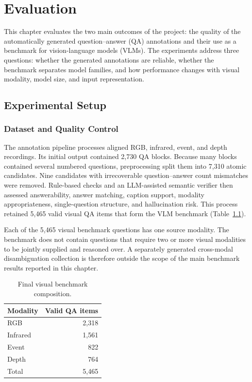
\chapter{Evaluation}
\label{ch:evaluation}

This chapter evaluates the two main outcomes of the project: the quality of
the automatically generated question--answer (QA) annotations and their use as
a benchmark for vision-language models (VLMs). The experiments address three
questions: whether the generated annotations are reliable, whether the
benchmark separates model families, and how performance changes with visual
modality, model size, and input representation.


\section{Experimental Setup}
\label{sec:evaluation_setup}

\subsection{Dataset and Quality Control}

The annotation pipeline processes aligned RGB, infrared, event, and
depth recordings. Its initial output contained 2,730 QA blocks. Because many
blocks contained several numbered questions, preprocessing split them into
7,310 atomic candidates. Nine candidates with irrecoverable question--answer
count mismatches were removed. Rule-based checks and an LLM-assisted semantic
verifier then assessed answerability, answer matching, caption support,
modality appropriateness, single-question structure, and hallucination
risk. This process retained 5,465 valid visual QA items that form the VLM benchmark
(Table~\ref{tab:dataset_summary}).

Each of the 5,465 visual benchmark questions has one source modality. The
benchmark does not contain questions that require two or more visual
modalities to be jointly supplied and reasoned over. A separately generated
cross-modal disambiguation collection is therefore outside the scope of the
main benchmark results reported in this chapter.

\begin{table}[ht]
    \centering
    \caption{Final visual benchmark composition.}
    \label{tab:dataset_summary}
    \begin{tabular}{lr}
        \toprule
        \textbf{Modality} & \textbf{Valid QA items} \\
        \midrule
        RGB      & 2,318 \\
        Infrared & 1,561 \\
        Event    &   822 \\
        Depth    &   764 \\
        \midrule
        Total    & 5,465 \\
        \bottomrule
    \end{tabular}
\end{table}


